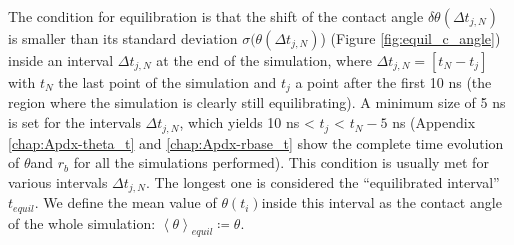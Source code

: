 The condition for equilibration is that the shift of the contact
angle $\delta\theta(\varDelta t_{j,N})$ is smaller than its standard
deviation $\sigma(\theta(\Delta t_{j,N})$) (Figure \ref{fig:equil_c_angle})
inside an interval $\varDelta t_{j,N}$ at the end of the simulation,
where $\Delta t_{j,N}=\left[t_{N}-t_{j}\right]$ with $t_{N}$ the
last point of the simulation and $t_{j}$ a point after the first
10 ns (the region where the simulation is clearly still equilibrating).
A minimum size of 5 ns is set for the intervals $\Delta t_{j,N}$,
which yields 10 ns < $t_{j}$ < $t_{N}-5$ ns (Appendix \ref{chap:Apdx-theta_t}
and \ref{chap:Apdx-rbase_t} show the complete time evolution of $\theta$and
$r_{b}$ for all the simulations performed). This condition is usually
met for various intervals $\varDelta t_{j,N}$. The longest one is
considered the ``equilibrated interval'' $t_{equil}$. We define
the mean value of $\theta(t_{i})$inside this interval as the contact
angle of the whole simulation: $\left\langle \theta\right\rangle _{equil}\coloneqq\theta$.
